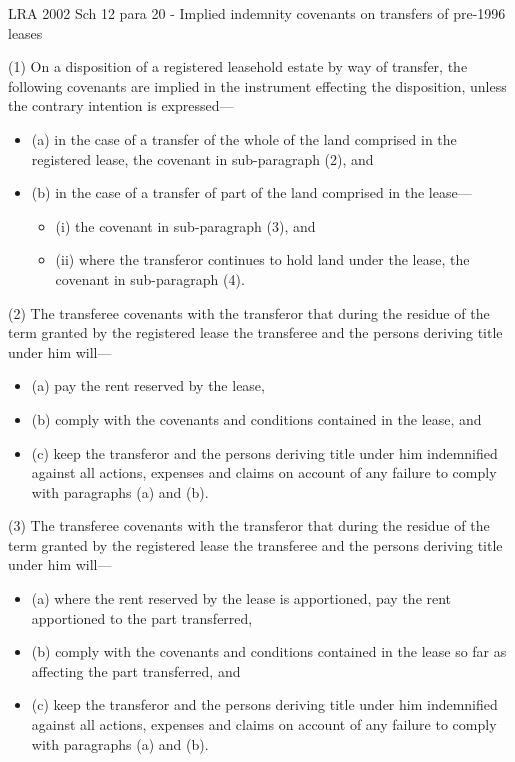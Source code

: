 \documentclass[
]{article}
\providecommand{\tightlist}{%
  \setlength{\itemsep}{0pt}\setlength{\parskip}{0pt}}
\newenvironment{env-2aad614f-6fd6-4025-876c-fcdbeae766fb}
{
    \savenotes\tcolorbox[blanker,breakable,left=5pt,borderline west={2pt}{-4pt}{green}]
}
{
    \endtcolorbox\spewnotes
}
\begin{document}
\begin{env-2aad614f-6fd6-4025-876c-fcdbeae766fb}

LRA 2002 Sch 12 para 20 - Implied indemnity covenants on transfers of
pre-1996 leases

(1) On a disposition of a registered leasehold estate by way of
transfer, the following covenants are implied in the instrument
effecting the disposition, unless the contrary intention is expressed---

\begin{itemize}
\tightlist
\item
  (a) in the case of a transfer of the whole of the land comprised in
  the registered lease, the covenant in sub-paragraph (2), and
\item
  (b) in the case of a transfer of part of the land comprised in the
  lease---

  \begin{itemize}
  \tightlist
  \item
    (i) the covenant in sub-paragraph (3), and
  \item
    (ii) where the transferor continues to hold land under the lease,
    the covenant in sub-paragraph (4).
  \end{itemize}
\end{itemize}

(2) The transferee covenants with the transferor that during the residue
of the term granted by the registered lease the transferee and the
persons deriving title under him will---

\begin{itemize}
\tightlist
\item
  (a) pay the rent reserved by the lease,
\item
  (b) comply with the covenants and conditions contained in the lease,
  and
\item
  (c) keep the transferor and the persons deriving title under him
  indemnified against all actions, expenses and claims on account of any
  failure to comply with paragraphs (a) and (b).
\end{itemize}

(3) The transferee covenants with the transferor that during the residue
of the term granted by the registered lease the transferee and the
persons deriving title under him will---

\begin{itemize}
\tightlist
\item
  (a) where the rent reserved by the lease is apportioned, pay the rent
  apportioned to the part transferred,
\item
  (b) comply with the covenants and conditions contained in the lease so
  far as affecting the part transferred, and
\item
  (c) keep the transferor and the persons deriving title under him
  indemnified against all actions, expenses and claims on account of any
  failure to comply with paragraphs (a) and (b).
\end{itemize}


\end{env-2aad614f-6fd6-4025-876c-fcdbeae766fb}
\end{document}
